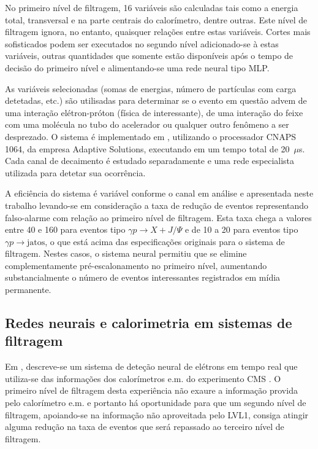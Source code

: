 No primeiro nível de filtragem, 16 variáveis são calculadas tais como a
energia total, transversal e na parte centrais do calorímetro, dentre
outras. Este nível de filtragem ignora, no entanto, quaisquer relações entre
estas variáveis. Cortes mais sofisticados podem ser executados no segundo
nível adicionado-se à estas variáveis, outras quantidades que somente estão
disponíveis após o tempo de decisão do primeiro nível e alimentando-se uma
rede neural tipo MLP.

As variáveis selecionadas (somas de energias, número de partículas com carga
detetadas, etc.) são utilisadas para determinar se o evento em questão advem
de uma interação elétron-próton (física de interessante), de uma interação do
feixe com uma molécula no tubo do acelerador ou qualquer outro fenômeno a ser
desprezado. O sistema é implementado em , utilizando o
processador CNAPS 1064, da empresa Adaptive Solutions, executando em um tempo
total de 20~$\mu$s. Cada canal de decaimento é estudado separadamente e uma
rede especialista utilizada para detetar sua ocorrência.

A eficiência do sistema é variável conforme o canal em análise e apresentada
neste trabalho levando-se em consideração a taxa de redução de eventos
representando falso-alarme com relação ao primeiro nível de filtragem. Esta
taxa chega a valores entre 40 e 160 para eventos tipo $\gamma p \rightarrow X
+ J/\Psi$ e de 10 a 20 para eventos tipo $\gamma p \rightarrow \text{jatos}$,
o que está acima das especificações originais para o sistema de
filtragem. Nestes casos, o sistema neural permitiu que se elimine
complementamente pré-escalonamento no primeiro nível, aumentando
substancialmente o número de eventos interessantes registrados em mídia
permanente.

\subsection{Redes neurais e calorimetria em sistemas de filtragem}

Em \cite{varela-cms-1998}, descreve-se um sistema de deteção neural de
elétrons em tempo real que utiliza-se das informações dos calorímetros e.m. do
experimento CMS \cite{cms-trigger}. O primeiro nível de filtragem desta
experiência não exaure a informação provida pelo calorímetro e.m. e portanto
há oportunidade para que um segundo nível de filtragem, apoiando-se na
informação não aproveitada pelo LVL1, consiga atingir alguma redução na taxa
de eventos que será repassado ao terceiro nível de filtragem.

